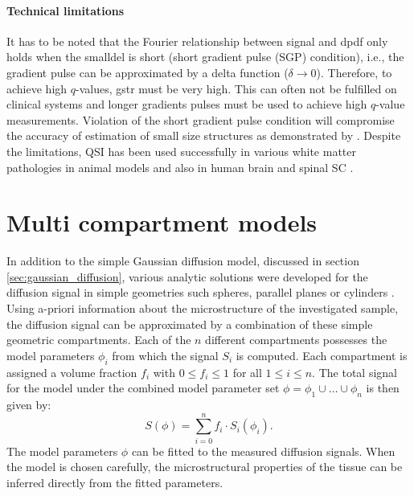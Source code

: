 \paragraph*{Technical limitations}
It has to be noted that the Fourier relationship between signal and  {\gls{dpdf}} only holds when the {\gls{smalldel}} is short (short gradient pulse (SGP) condition), i.e., the gradient pulse can be approximated by a delta function ($\delta\rightarrow 0$). Therefore, to achieve high $q$-values, \gls{gstr} must be very high. This can often not be fulfilled on clinical systems and longer gradients pulses must be used to achieve high $q$-value measurements. Violation of the short gradient pulse condition will compromise the accuracy of estimation of small size structures as demonstrated by \cite{Linse:1995, Latt:2007}. Despite the limitations, \gls{QSI} has been used successfully in various white matter pathologies in animal models \citep{Ong:2008} and also in human brain \citep{Assaf:2002} and spinal {\gls{SC}} \citep{Assaf:2000, Farrell:2008}.

\section{Multi compartment models}
\label{sec:multicompartment_modeling}
In addition to the simple Gaussian diffusion model, discussed in section \ref{sec:gaussian_diffusion}, various analytic solutions were developed for the diffusion signal in simple geometries such spheres, parallel planes \citep{Balinov:1993, Linse:1995, Callaghan:1996} or cylinders \citep{Gelderen:1994}. Using a-priori information about the microstructure of the investigated sample, the diffusion signal can be approximated by a combination of these simple geometric compartments. Each of the $n$ different compartments possesses the model parameters $\phi_{i}$ from which the signal $S_i$ is computed. Each compartment is assigned a volume fraction $f_i$ with $0 \le f_i \le 1$ for all $1 \le i \le n$. The total signal for the model under the combined model parameter set $\phi=\phi_{1}\cup\dots\cup\phi_{n}$ is then given by:
\begin{equation}
	S(\phi)=\sum_{i=0}^{n}f_i\cdot S_i(\phi_i).
\end{equation}
The model parameters $\phi$ can be fitted to the measured diffusion signals. When the model is chosen carefully, the microstructural properties of the tissue  can be inferred directly from the fitted parameters.


